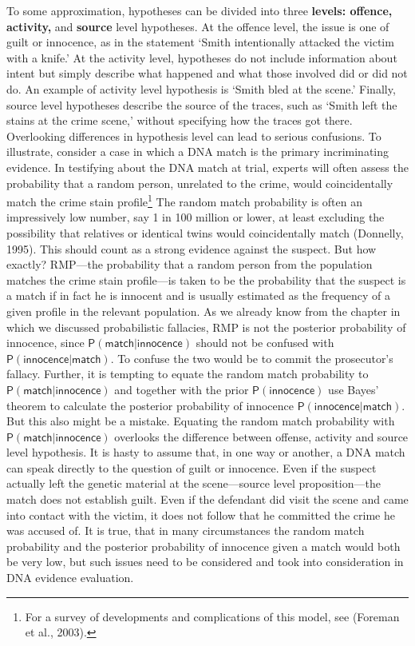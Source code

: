 \documentclass[
  10pt,
  dvipsnames,enabledeprecatedfontcommands]{scrartcl}
\newcommand{\pr}[1]{\mathsf{P}(#1)}
\begin{document}
To some approximation, hypotheses can be divided into three
\textbf{levels: offence, activity,} and \textbf{source} level
hypotheses. At the offence level, the issue is one of guilt or
innocence, as in the statement `Smith intentionally attacked the victim
with a knife.' At the activity level, hypotheses do not include
information about intent but simply describe what happened and what
those involved did or did not do. An example of activity level
hypothesis is `Smith bled at the scene.' Finally, source level
hypotheses describe the source of the traces, such as `Smith left the
stains at the crime scene,' without specifying how the traces got there.
Overlooking differences in hypothesis level can lead to serious
confusions. To illustrate, consider a case in which a DNA match is the
primary incriminating evidence. In testifying about the DNA match at
trial, experts will often assess the probability that a random person,
unrelated to the crime, would coincidentally match the crime stain
profile\footnote{For a survey of developments and complications of this
  model, see (Foreman et al., 2003).} The random match probability is
often an impressively low number, say 1 in 100 million or lower, at
least excluding the possibility that relatives or identical twins would
coincidentally match (Donnelly, 1995). This should count as a strong
evidence against the suspect. But how exactly? RMP---the probability
that a random person from the population matches the crime stain
profile---is taken to be the probability that the suspect is a match if
in fact he is innocent and is usually estimated as the frequency of a
given profile in the relevant population. As we already know from the
chapter in which we discussed probabilistic fallacies, RMP is not the
posterior probability of innocence, since
\(\pr{\textsf{match} \vert \textsf{innocence}}\) should not be confused
with \(\pr{\textsf{innocence} \vert \textsf{match}}\). To confuse the
two would be to commit the prosecutor's fallacy. Further, it is tempting
to equate the random match probability to
\(\pr{\textsf{match} \vert \textsf{innocence}}\) and together with the
prior \(\pr{\textsf{innocence}}\) use Bayes' theorem to calculate the
posterior probability of innocence
\(\pr{\textsf{innocence} \vert \textsf{match}}\). But this also might be
a mistake. Equating the random match probability with
\(\pr{\textsf{match} \vert \textsf{innocence}}\) overlooks the
difference between offense, activity and source level hypothesis. It is
hasty to assume that, in one way or another, a DNA match can speak
directly to the question of guilt or innocence. Even if the suspect
actually left the genetic material at the scene---source level
proposition---the match does not establish guilt. Even if the defendant
did visit the scene and came into contact with the victim, it does not
follow that he committed the crime he was accused of. It is true, that
in many circumstances the random match probability and the posterior
probability of innocence given a match would both be very low, but such
issues need to be considered and took into consideration in DNA evidence
evaluation.
\end{document}
